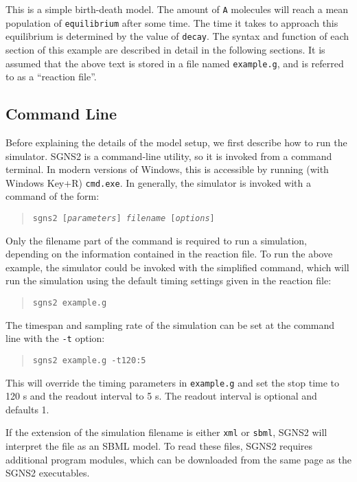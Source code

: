 \documentclass[10pt]{article}
\newcommand{\code}[1]{{\tt {#1}}}
\newcommand{\codeparam}[1]{\textrm{\textit{#1}}}
\newcommand{\optparam}[1]{\textrm{[\textit{#1}]}}
\newcommand{\programname}{SGNS2}
\newcommand{\progexe}{sgns2}
\begin{document}
This is a simple birth-death model. The amount of \code{A} molecules will reach a mean population of \code{equilibrium} after some time. The time it takes to approach this equilibrium is determined by the value of \code{decay}. The syntax and function of each section of this example are described in detail in the following sections. It is assumed that the above text is stored in a file named \code{example.g}, and is referred to as a ``reaction file''.

\subsection{Command Line}

Before explaining the details of the model setup, we first describe how to run the simulator. {\programname} is a command-line utility, so it is invoked from a command terminal. In modern versions of Windows, this is accessible by running (with Windows Key+R) \code{cmd.exe}. In generally, the simulator is invoked with a command of the form:

\begin{quote}
\code{\progexe\ \optparam{parameters} \codeparam{filename} \optparam{options}}
\end{quote}

Only the filename part of the command is required to run a simulation, depending on the information contained in the reaction file. To run the above example, the simulator could be invoked with the simplified command, which will run the simulation using the default timing settings given in the reaction file:

\begin{quote}
\code{\progexe\ example.g}
\end{quote}

The timespan and sampling rate of the simulation can be set at the command line with the \code{-t} option:

\begin{quote}
\code{\progexe\ example.g -t120:5}
\end{quote}

This will override the timing parameters in \code{example.g} and set the stop time to 120 s and the readout interval to 5 s. The readout interval is optional and defaults 1.

If the extension of the simulation filename is either \code{xml} or \code{sbml}, {\programname} will interpret the file as an SBML model. To read these files, {\programname} requires additional program modules, which can be downloaded from the same page as the {\programname} executables.
\end{document}
